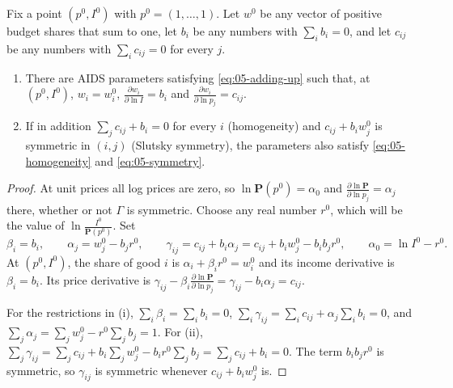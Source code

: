 \begin{proposition}\label{prop:05-flexible}
Fix a point $(p^0, I^0)$ with $p^0 = (1, \dots, 1)$. Let $w^0$ be any vector of positive budget shares that sum
to one, let $b_i$ be any numbers with $\sum_ib_i = 0$, and let $c_{ij}$ be any numbers with
$\sum_ic_{ij} = 0$ for every $j$.
\begin{enumerate}[label=(\roman*)]
\item There are AIDS parameters satisfying \eqref{eq:05-adding-up} such that, at $(p^0, I^0)$,
  $w_i = w^0_i$, $\frac{\partial w_i}{\partial\ln I} = b_i$ and $\frac{\partial w_i}{\partial\ln p_j} = c_{ij}$.
\item If in addition $\sum_jc_{ij} + b_i = 0$ for every $i$ (homogeneity) and $c_{ij} + b_iw^0_j$ is
  symmetric in $(i, j)$ (Slutsky symmetry), the parameters also satisfy \eqref{eq:05-homogeneity} and
  \eqref{eq:05-symmetry}.
\end{enumerate}
\end{proposition}

\begin{proof}
At unit prices all log prices are zero, so $\ln\mathbf{P}(p^0) = \alpha_0$ and
$\frac{\partial\ln\mathbf{P}}{\partial\ln p_j} = \alpha_j$ there, whether or not $\Gamma$ is symmetric. Choose
any real number $r^0$, which will be the value of $\ln\frac{I^0}{\mathbf{P}(p^0)}$. Set
\begin{equation*}
\beta_i = b_i, \qquad \alpha_j = w^0_j - b_jr^0, \qquad \gamma_{ij} = c_{ij} + b_i\alpha_j
= c_{ij} + b_iw^0_j - b_ib_jr^0, \qquad \alpha_0 = \ln I^0 - r^0 .
\end{equation*}
At $(p^0, I^0)$, the share of good $i$ is $\alpha_i + \beta_ir^0 = w^0_i$ and its income derivative is
$\beta_i = b_i$. Its price derivative is
$\gamma_{ij} - \beta_i\frac{\partial\ln\mathbf{P}}{\partial\ln p_j} = \gamma_{ij} - b_i\alpha_j = c_{ij}$.

For the restrictions in (i), $\sum_i\beta_i = \sum_ib_i = 0$,
$\sum_i\gamma_{ij} = \sum_ic_{ij} + \alpha_j\sum_ib_i = 0$, and
$\sum_j\alpha_j = \sum_jw^0_j - r^0\sum_jb_j = 1$. For (ii),
$\sum_j\gamma_{ij} = \sum_jc_{ij} + b_i\sum_jw^0_j - b_ir^0\sum_jb_j = \sum_jc_{ij} + b_i = 0$. The term
$b_ib_jr^0$ is symmetric, so $\gamma_{ij}$ is symmetric whenever $c_{ij} + b_iw^0_j$ is.
\end{proof}

